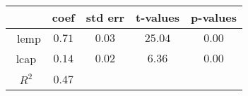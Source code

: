 \begin{table}[H]
\centering
\begin{tabular}{c | cccc}
 & \textbf{coef} & \textbf{std err} & \textbf{t-values} & \textbf{p-values} \\
\toprule \
lemp       &  $0.71$ & $0.03$ & $25.04$ & $0.00$  \\
lcap       &  $0.14$ & $0.02$ & $6.36$ & $0.00$  \\
\midrule 
$R^2$ & 0.47 && \\
\bottomrule
\end{tabular}
\caption{}
\label{}
\end{table}